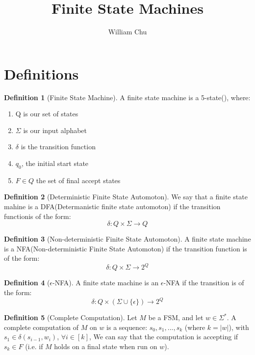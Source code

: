 \documentclass{article}
\theoremstyle{definition}
\newtheorem{definition}{Definition}[section]
\begin{document}
 

\title{Finite State Machines} 
\author{William Chu} 
\maketitle 

\section{Definitions}

\begin{definition}[Finite State Machine]
A finite state machine is a 5-state(), where:
	\begin{enumerate}
		\item Q is our set of states
		\item $\Sigma$ is our input alphabet
		\item $\delta$ is the transition function
		\item $q_0$, the initial start state
		\item $F \in Q$ the set of final accept states
	\end{enumerate}
\end{definition}

\begin{definition}[Deterministic Finite State Automoton]
We say that a finite state mahine is a DFA(Determanistic finite state automoton) if the transition functionis of the form: $$\delta: Q \times \Sigma \rightarrow Q$$
\end{definition}

\begin{definition}[Non-deterministic Finite State Automoton]
A finite state machine is a NFA(Non-deterministic Finite State Automoton) if the transition function is of the form: $$\delta: Q\times \Sigma \rightarrow 2^Q$$
\end{definition}

\begin{definition}[$\epsilon$-NFA]
A finite state machine is an $\epsilon$-NFA if the transition is of the form: $$\delta: Q \times (\Sigma \cup \{\epsilon\}) \rightarrow 2^Q$$
\end{definition}

\begin{definition}[Complete Computation]
Let $M$ be a FSM, and let $w \in \Sigma^*$. A complete computation of $M$ on $w$ is a sequence: $s_0, s_1,...,s_k$ (where $k=|w|$), with $s_1\in \delta(s_{i-1},w_i)$, $\forall i\in [k]$, We can say that the computation is accepting if $s_k \in F$ (i.e. if $M$ holds on a final state when run on $w$).
\end{definition}
\end{document}
